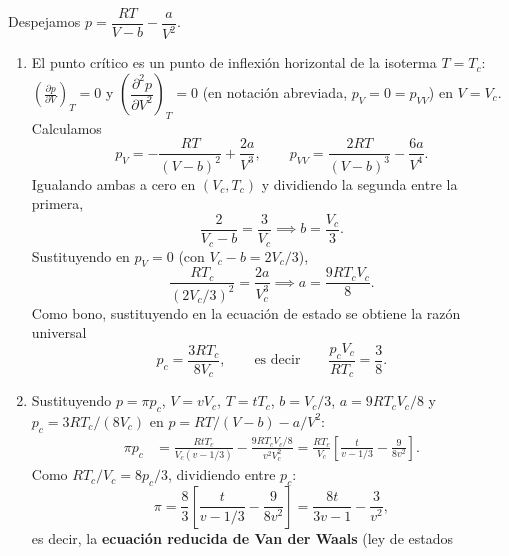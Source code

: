 \documentclass[12pt,a4paper]{article}
\newcommand{\pd}[3]{\left(\frac{\partial #1}{\partial #2}\right)_{#3}}
\begin{document}
    \begin{solucion}
        Despejamos $p=\dfrac{RT}{V-b}-\dfrac{a}{V^{2}}$.
        \begin{enumerate}
            \item[a)] El punto crítico es un punto de inflexión horizontal de la isoterma
            $T=T_{c}$: $\pd pVT=0$ y $\left(\dfrac{\partial^{2}p}{\partial V^{2}}\right)_{T}=0$ (en notación abreviada, $p_{V}=0=p_{VV}$)
            en $V=V_{c}$. Calculamos
            \begin{equation*}
                p_{V}=-\frac{RT}{(V-b)^{2}}+\frac{2a}{V^{3}}, \qquad
                p_{VV}=\frac{2RT}{(V-b)^{3}}-\frac{6a}{V^{4}}.
            \end{equation*}
            Igualando ambas a cero en $(V_{c},T_{c})$ y dividiendo la segunda entre la primera,
            \begin{equation*}
                \frac{2}{V_{c}-b}=\frac{3}{V_{c}} \implies b=\frac{V_{c}}{3}.
            \end{equation*}
            Sustituyendo en $p_{V}=0$ (con $V_{c}-b=2V_{c}/3$),
            \begin{equation*}
                \frac{RT_{c}}{(2V_{c}/3)^{2}}=\frac{2a}{V_{c}^{3}} \implies a=\frac{9RT_{c}V_{c}}{8}.
            \end{equation*}
            Como bono, sustituyendo en la ecuación de estado se obtiene la razón universal
            \begin{equation*}
                p_{c}=\frac{3RT_{c}}{8V_{c}}, \qquad \text{es decir} \qquad \frac{p_{c}V_{c}}{RT_{c}}=\frac38.
            \end{equation*}
            \item[b)] Sustituyendo $p=\pi p_{c}$, $V=vV_{c}$, $T=tT_{c}$, $b=V_{c}/3$,
            $a=9RT_{c}V_{c}/8$ y $p_{c}=3RT_{c}/(8V_{c})$ en $p=RT/(V-b)-a/V^{2}$:
            \begin{align*}
                \pi p_{c}&=\frac{RtT_{c}}{V_{c}(v-1/3)}-\frac{9RT_{c}V_{c}/8}{v^{2}V_{c}^{2}}
                =\frac{RT_{c}}{V_{c}}\left[\frac{t}{v-1/3}-\frac{9}{8v^{2}}\right].
            \end{align*}
            Como $RT_{c}/V_{c}=8p_{c}/3$, dividiendo entre $p_{c}$:
            \begin{equation*}
                \pi=\frac{8}{3}\left[\frac{t}{v-1/3}-\frac{9}{8v^{2}}\right]=\frac{8t}{3v-1}-\frac{3}{v^{2}},
            \end{equation*}
            es decir, la \textbf{ecuación reducida de Van der Waals} (ley de estados

\end{enumerate}
\end{solucion}
\end{document}
